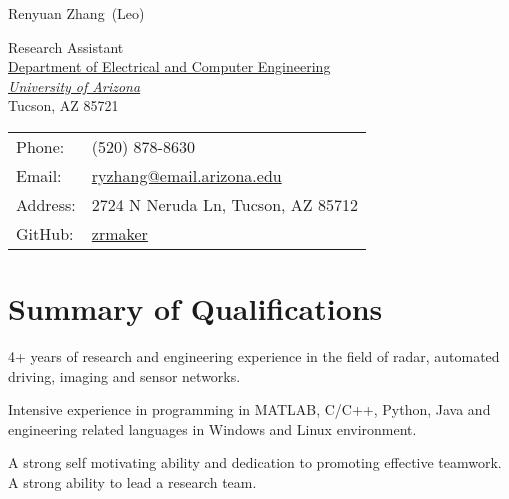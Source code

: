 \documentclass[letterpaper,10pt]{article}
\def\name{Renyuan Zhang}
\renewenvironment{itemize}{
  \begin{list}{}{
    \setlength{\leftmargin}{1.5em}
  }
}{
  \end{list}
}
\begin{document}
{\huge \name \textnormal \ (Leo)}


\vspace{0.25in}

\begin{minipage}{0.55\linewidth}
  Research Assistant \\
  \href{http://ece.arizona.edu/}{Department of Electrical and Computer Engineering} \\
\href{http://www.arizona.edu/}{\it University of Arizona} \\
  Tucson, AZ 85721
\end{minipage}
\begin{minipage}{0.4\linewidth}
  \begin{tabular}{ll}
    Phone: & (520) 878-8630 \\
    Email: & \href{mailto:ryzhang@email.arizona.edu}{ryzhang@email.arizona.edu} \\
    Address: & 2724 N Neruda Ln, Tucson, AZ 85712\\
    GitHub: & \href{https://github.com/zrmaker}{zrmaker}
  \end{tabular}
\end{minipage}


%

\section*{Summary of Qualifications}
\begin{itemize}
  \item 4+ years of research and engineering experience in the field of radar, automated driving, imaging and sensor networks.
  \item Intensive experience in programming in MATLAB, C/C++, Python, Java and engineering related languages in Windows and Linux environment.
  \item A strong self motivating ability and dedication to promoting effective teamwork. A strong ability to lead a research team.
\end{itemize}
\end{document}

